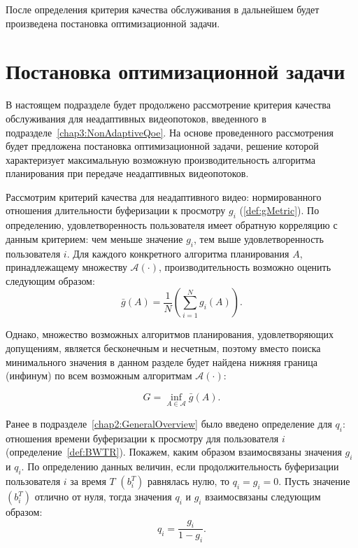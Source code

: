 После определения критерия качества обслуживания в дальнейшем будет произведена постановка оптимизационной задачи.

\section{Постановка оптимизационной задачи}
\label{chap3:NonAdaptiveOptimizationProblem}

В настоящем подразделе будет продолжено рассмотрение критерия качества обслуживания для неадаптивных видеопотоков, введенного в подразделе~\ref{chap3:NonAdaptiveQoe}. На основе проведенного рассмотрения будет предложена постановка оптимизационной задачи, решение которой характеризует максимальную возможную производительность алгоритма планирования при передаче неадаптивных видеопотоков.

Рассмотрим критерий качества для неадаптивного видео: нормированного отношения длительности буферизации к просмотру $g_i$ (\ref{def:gMetric}). По определению, удовлетворенность пользователя имеет обратную корреляцию с данным критерием: чем меньше значение $g_i$, тем выше удовлетворенность пользователя $i$. Для каждого конкретного алгоритма планирования $A$, принадлежащему множеству $\mathcal{A}(\cdot)$, производительность возможно оценить следующим образом:
$$\bar{g}\left(A\right) = \frac{1}{N}\left(\sum\limits_{i=1}^{N} {g_i\left(A\right)}\right).$$

Однако, множество возможных алгоритмов планирования, удовлетворяющих допущениям, является бесконечным и несчетным, поэтому вместо поиска минимального значения в данном разделе будет найдена нижняя граница (инфинум) по всем возможным алгоритмам $\mathcal{A}(\cdot)$:

\begin{equation}
	\label{eq:gMetricGoal}
	G = \inf\limits_{A \in \mathcal{A}} \bar{g}\left(A\right).
\end{equation}

Ранее в подразделе~\ref{chap2:GeneralOverview} было введено определение для $q_i$: отношения времени буферизации к просмотру для пользователя $i$ (определение~\ref{def:BWTR}). Покажем, каким образом взаимосвязаны значения $g_i$ и $q_i$. По определению данных величин, если продолжительность буферизации пользователя $i$ за время $T$ $\left(b_i^T\right)$ равнялась нулю, то $q_i=g_i=0$. Пусть значение $\left(b_i^T\right)$ отлично от нуля, тогда значения $q_i$ и $g_i$ взаимосвязаны следующим образом:
$$q_i = \frac{g_i}{1-g_i}.$$

